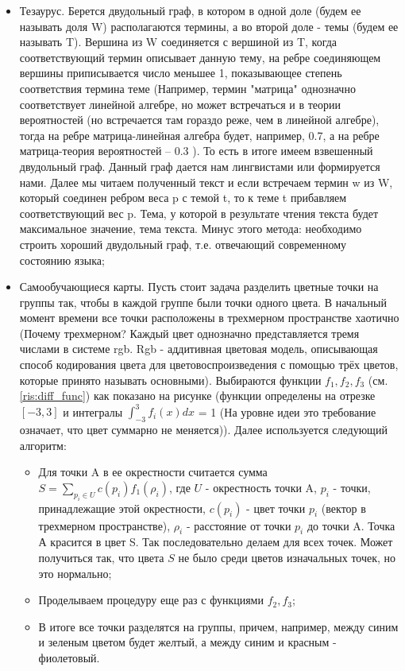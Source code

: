 \begin {itemize}
\item Тезаурус. Берется двудольный граф, в котором в одной доле (будем ее называть доля  W) располагаются термины, а во второй доле - темы (будем ее называть T). Вершина из W соединяется с вершиной из T, когда соответствующий термин описывает данную тему, на ребре соединяющем вершины приписывается число меньшее 1, показывающее степень соответствия термина теме (Например, термин "матрица" однозначно соответствует линейной алгебре, но может встречаться и в теории вероятностей (но встречается там гораздо реже, чем в линейной алгебре), тогда на ребре матрица-линейная алгебра будет, например, 0.7, а на ребре матрица-теория вероятностей -- 0.3 ). То есть в итоге имеем взвешенный двудольный граф. Данный граф дается нам лингвистами или формируется нами. Далее мы читаем полученный текст и если встречаем термин w из W, который соединен ребром веса p с темой t, то к теме t  прибавляем соответствующий вес p. Тема, у которой в результате чтения текста будет максимальное значение, тема текста. Минус этого метода: необходимо строить хороший двудольный граф, т.е. отвечающий современному состоянию языка;
\item Самообучающиеся карты.
Пусть стоит задача разделить цветные точки на группы так, чтобы в каждой группе были точки одного цвета. В начальный момент времени все точки расположены в трехмерном пространстве хаотично (Почему трехмерном? Каждый цвет однозначно представляется тремя числами в системе rgb. Rgb - аддитивная цветовая модель, описывающая способ кодирования цвета для цветовоспроизведения с помощью трёх цветов, которые принято называть основными). Выбираются функции $f_1, f_2, f_3$ (см. \ref{ris:diff_func}) как показано на рисунке (функции определены на отрезке $[-3, 3]$ и интегралы $\int_{-3}^3 f_i (x) dx$ = 1 (На уровне идеи это требование означает, что цвет суммарно не меняется)).
Далее используется следующий алгоритм:
\begin {itemize}
\item Для точки A в ее окрестности считается сумма $S = \sum\limits_{p_i \in U} c (p_i) f_1 (\rho_i)$, где $U$ - окрестность точки A, $p_i$ - точки, принадлежащие этой окрестности, $c (p_i)$ - цвет точки $p_i$ (вектор в трехмерном пространстве), $\rho_i$ - расстояние от точки $p_i$ до точки A. Точка А красится в цвет S. Так последовательно делаем для всех точек. Может получиться так, что цвета $S$ не было среди цветов изначальных точек, но это нормально;
\item Проделываем процедуру еще раз с функциями $f_2, f_3$;
\item В итоге все точки разделятся на группы, причем, например, между синим и зеленым цветом будет желтый, а между синим и красным - фиолетовый.
\end {itemize}


\end{itemize}
